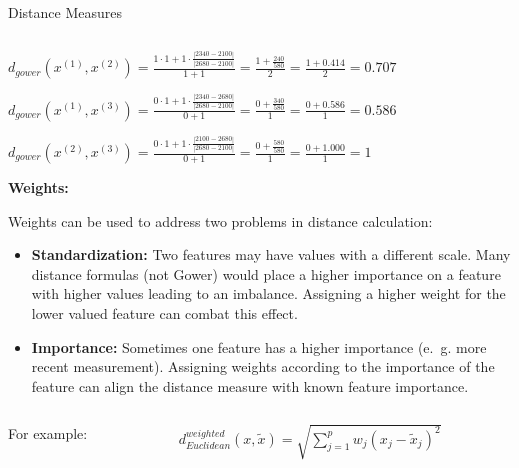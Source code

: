 \documentclass[11pt,compress,t,notes=noshow, xcolor=table]{beamer}
\newenvironment{knitrout}{}{} %
\begin{document}
\begin{vbframe}{Distance Measures}
\begin{columns}[T]
\begin{column}{0.4\textwidth}
\begin{knitrout}
\end{knitrout}
  \end{column}
  \begin{column}{0.5\textwidth}
    \vspace{0.6cm}
  \end{column}
\end{columns}

\vfill

$d_{gower}(x^{(1)},x^{(2)}) = \frac{ 1 \cdot 1 + 1 \cdot \frac{\left| 2340 - 2100 \right|}
{\left| 2680 - 2100 \right|}}{1 + 1} = \frac{1 + \frac{240}{580}}{2} = \frac{1 + 0.414}{2} = 0.707
$

\vfill

$d_{gower}(x^{(1)},x^{(3)}) = \frac{ 0 \cdot 1 + 1 \cdot \frac{\left| 2340 - 2680 \right|}
{\left| 2680 - 2100 \right|}}{0 + 1} = \frac{0 + \frac{340}{580}}{1} = \frac{0 + 0.586}{1} = 0.586
$

\vfill

$d_{gower}(x^{(2)},x^{(3)}) = \frac{0 \cdot 1 + 1 \cdot \frac{\left| 2100 - 2680 \right|}
{\left| 2680 - 2100 \right|}}{0 + 1} = \frac{0 + \frac{580}{580}}{1} = \frac{0 + 1.000}{1} = 1
$

\vfill

\framebreak

\textbf{Weights:}
\vfill

Weights can be used to address two problems in distance calculation:

\begin{itemize}
  \item \textbf{Standardization:} Two features may have values with a different scale. Many distance formulas (not Gower) would place a higher importance on a feature with higher values leading to an imbalance. Assigning a higher weight for the lower valued feature can combat this effect.
  \item \textbf{Importance:} Sometimes one feature has a higher importance (e.~g. more recent measurement). Assigning weights according to the importance of the feature can align the distance measure with known feature importance.
\end{itemize}

\begin{columns}[T]
  \begin{column}{0.2\textwidth}
    For example:
  \end{column}
  \begin{column}{0.8\textwidth}
     $d^{weighted}_{Euclidean}\left(x, \tilde{x}\right) = \sqrt{\sum_{j=1}^pw_{j}(x_j- \tilde{x}_j)^2}$
  \end{column}
\end{columns}

\vfill

\end{vbframe}
\end{document}
